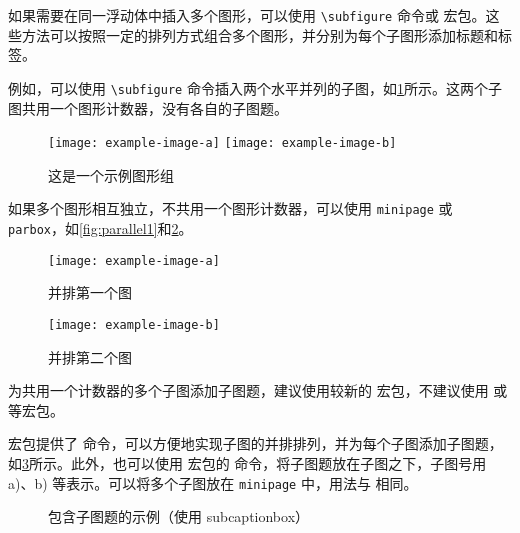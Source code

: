 如果需要在同一浮动体中插入多个图形，可以使用 \verb|\subfigure| 命令或  宏包。这些方法可以按照一定的排列方式组合多个图形，并分别为每个子图形添加标题和标签。

例如，可以使用 \verb|\subfigure| 命令插入两个水平并列的子图，如\cref{fig:example-subfig-1}所示。这两个子图共用一个图形计数器，没有各自的子图题。

\begin{figure}[!htp]
  \centering
  \texttt{[image: example-image-a]}
  \hspace{1cm}
  \texttt{[image: example-image-b]}
  \caption{这是一个示例图形组}
  \label{fig:example-subfig-1}
\end{figure}

如果多个图形相互独立，不共用一个图形计数器，可以使用 \texttt{minipage} 或 \texttt{parbox}，如\cref{fig:parallel1}和\cref{fig:parallel2}。

\begin{figure}[!htp]
  \begin{minipage}{0.4\textwidth}
    \centering
    \texttt{[image: example-image-a]}
    \caption{并排第一个图}
    \label{fig:parallel1}
  \end{minipage}\hfill
  \begin{minipage}{0.4\textwidth}
    \centering
    \texttt{[image: example-image-b]}
    \caption{并排第二个图}
    \label{fig:parallel2}
  \end{minipage}
\end{figure}

为共用一个计数器的多个子图添加子图题，建议使用较新的  宏包，不建议使用  或  等宏包。

 宏包提供了  命令，可以方便地实现子图的并排排列，并为每个子图添加子图题，如\cref{fig:subcaptionbox}所示。此外，也可以使用  宏包的  命令，将子图题放在子图之下，子图号用 a)、b) 等表示。可以将多个子图放在 \texttt{minipage} 中，用法与  相同。

\begin{figure}[!htp]
  \centering
  \hspace{1cm}
  \caption{包含子图题的示例（使用 subcaptionbox）}
  \label{fig:subcaptionbox}
\end{figure}

